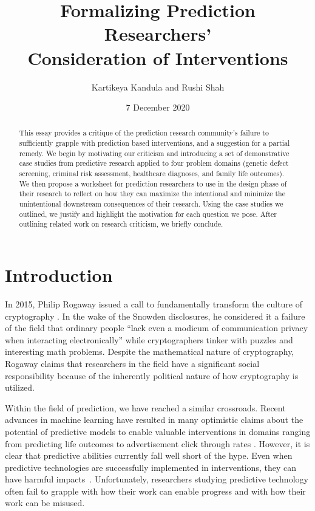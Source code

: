 \documentclass[12pt]{article}
\title{Formalizing Prediction Researchers' \\ Consideration of Interventions}
\author{Kartikeya Kandula and Rushi Shah}
\date{7 December 2020}
\begin{document}
\maketitle

\begin{abstract}
    This essay provides a critique of the prediction research community's failure to sufficiently grapple with prediction based interventions, and a suggestion for a partial remedy. We begin by motivating our criticism and introducing a set of demonstrative case studies from predictive research applied to four problem domains (genetic defect screening, criminal risk assessment, healthcare diagnoses, and family life outcomes). We then propose a worksheet for prediction researchers to use in the design phase of their research to reflect on how they can maximize  the  intentional  and  minimize  the  unintentional  downstream  consequences  of their research. Using the case studies we outlined, we justify and highlight the motivation for each question we pose. After outlining related work on research criticism, we briefly conclude.   
\end{abstract}

\section{Introduction}
In 2015, Philip Rogaway issued a call to fundamentally transform the culture of cryptography \cite{crypto}. In the wake of the Snowden disclosures, he considered it a failure of the field that ordinary people ``lack even a modicum of communication privacy when interacting electronically'' while cryptographers tinker with puzzles and interesting math problems. Despite the mathematical nature of cryptography, Rogaway claims that researchers in the field have a significant social responsibility because of the inherently political nature of how cryptography is utilized.

Within the field of prediction, we have reached a similar crossroads. Recent advances in machine learning have resulted in many optimistic claims about the potential of predictive models to enable valuable interventions in domains ranging from predicting life outcomes \cite{fragilefamilies} to advertisement click through rates \cite{ads}. However, it is clear that predictive abilities currently fall well short of the hype. Even when predictive technologies are successfully implemented in interventions, they can have harmful impacts~\cite{propublica}. Unfortunately, researchers studying predictive technology often fail to grapple with how their work can enable progress and with how their work can be misused.
\end{document}
